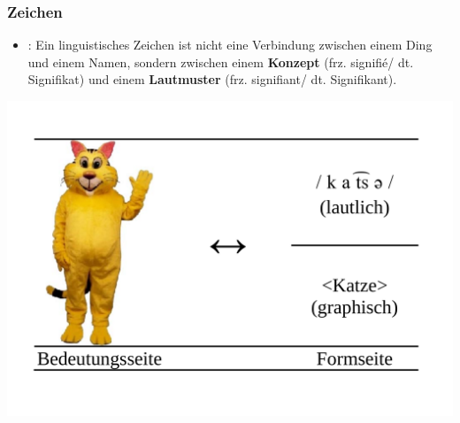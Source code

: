 \begin{frame} \frametitle{Zeichen}

\begin{itemize}
	\item \citet{Saussure16a}: Ein linguistisches Zeichen ist nicht eine Verbindung zwischen einem Ding und einem Namen, sondern zwischen einem \textbf{Konzept} (frz. signifié/ dt. Signifikat) und einem \textbf{Lautmuster} (frz. signifiant/ dt. Signifikant).
\end{itemize}	

\begin{center}
	\includegraphics[scale=.2]{material/01SSZeichenKatze}	
\end{center}

\end{frame}	



